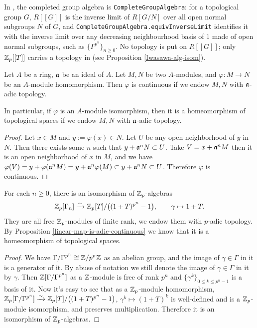 \begin{remark}
In {\Lean}, the completed group algebra is \texttt{CompleteGroupAlgebra}: for a
topological group $G$, $R[[G]]$ is the inverse limit of $R[G/N]$ over all open
normal subgroups $N$ of $G$, and \texttt{CompleteGroupAlgebra.equivInverseLimit}
identifies it with the inverse limit over any decreasing neighbourhood basis of
$1$ made of open normal subgroups, such as $\{\Gamma^{p^n}\}_{n\geq 0}$. No
topology is put on $R[[G]]$; only ${\mathbb {Z}}_p[[T]]$ carries a topology in {\Lean}
(see Proposition \ref{Iwasawa-alg-isom}).
\end{remark}

\begin{prop}
\label{linear-map-is-adic-continuous}
Let $A$ be a ring, ${\mathfrak{a}}$ be an ideal of $A$.
Let $M,N$ be two $A$-modules,
and $\varphi:M\to N$ be an $A$-module homomorphism.
Then $\varphi$ is continuous if we endow $M,N$ with ${\mathfrak{a}}$-adic topology.

In particular, if $\varphi$ is an $A$-module isomorphism,
then it is a homeomorphism of topological spaces if we endow $M,N$ with ${\mathfrak{a}}$-adic topology.
\end{prop}

\begin{proof}
Let $x\in M$ and $y:=\varphi(x)\in N$.
Let $U$ be any open neighborhood of $y$ in $N$.
Then there exists some $n$ such that $y+{\mathfrak{a}}^nN\subset U$.
Take $V=x+{\mathfrak{a}}^nM$ then it is an open neighborhood of $x$ in $M$,
and we have $\varphi(V)=y+\varphi({\mathfrak{a}}^nM)=y+{\mathfrak{a}}^n\varphi(M)\subset y+{\mathfrak{a}}^nN\subset U$.
Therefore $\varphi$ is continuous.
\end{proof}

\begin{prop}
\label{Iwasawa-alg-isom-finite-level}
For each $n\geq 0$, there is an isomorphism of ${\mathbb {Z}}_p$-algebras
$$
{\mathbb {Z}}_p[\Gamma_n]\xrightarrow\sim{\mathbb {Z}}_p[T]/\big((1+T)^{p^n}-1\big),\qquad
\gamma\mapsto 1+T.
$$
They are all free ${\mathbb {Z}}_p$-modules of finite rank,
we endow them with $p$-adic topology.
By Proposition \ref{linear-map-is-adic-continuous}
we know that it is a homeomorphism of topological spaces.
\end{prop}

\begin{proof}
We have $\Gamma/\Gamma^{p^n}\cong{\mathbb {Z}}/p^n{\mathbb {Z}}$ as an abelian group,
and the image of $\gamma\in\Gamma$
in it is a generator of it. By abuse of notation we still denote the image of
$\gamma\in\Gamma$ in it by $\gamma$.
Then ${\mathbb {Z}}[\Gamma/\Gamma^{p^n}]$ as a ${\mathbb {Z}}$-module is free of rank $p^n$
and $\{\gamma^k\}_{0\leq k\leq p^n-1}$ is a basis of it.
Now it's easy to see that as a ${\mathbb {Z}}_p$-module homomorphism,
${\mathbb {Z}}_p[\Gamma/\Gamma^{p^n}]\xrightarrow\sim{\mathbb {Z}}_p[T]/\big((1+T)^{p^n}-1\big)$,
$\gamma^k\mapsto(1+T)^k$ is well-defined and is a ${\mathbb {Z}}_p$-module isomorphism,
and preserves multiplication.
Therefore it is an isomorphism of ${\mathbb {Z}}_p$-algebras.
\end{proof}

